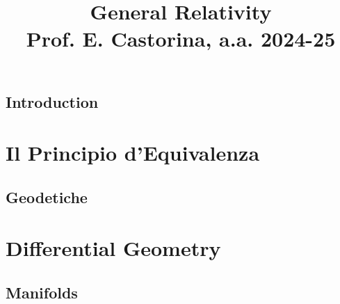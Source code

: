 \documentclass[a4paper, 12pt, openany]{book}
\title{\Huge\textbf{General Relativity} \\ \large Prof. E. Castorina, a.a. 2024-25}
\begin{document}
\frontmatter

\maketitle

\tableofcontents
\pagestyle{contents}

\mainmatter

\chapter*{Introduction}
\pagestyle{introd}



\part{Il Principio d'Equivalenza}
\pagestyle{body}

\chapter{Geodetiche}


\part{Differential Geometry}

\chapter{Manifolds}

\end{document}
